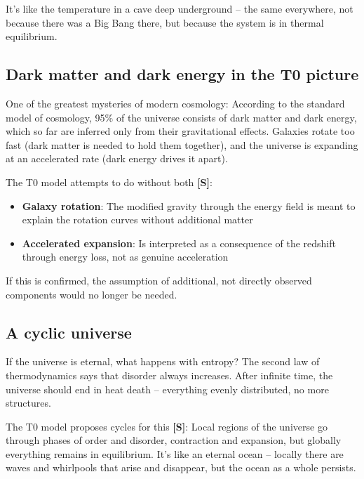 	It's like the temperature in a cave deep underground -- the same everywhere, not because there was a Big Bang there, but because the system is in thermal equilibrium.
	
	\subsection{Dark matter and dark energy in the T0 picture}
	
	One of the greatest mysteries of modern cosmology: According to the standard model of cosmology, 95\% of the universe consists of dark matter and dark energy, which so far are inferred only from their gravitational effects. Galaxies rotate too fast (dark matter is needed to hold them together), and the universe is expanding at an accelerated rate (dark energy drives it apart).
	
	The T0 model attempts to do without both \textbf{[S]}:
	\begin{itemize}
		\item \textbf{Galaxy rotation}: The modified gravity through the energy field is meant to explain the rotation curves without additional matter
		\item \textbf{Accelerated expansion}: Is interpreted as a consequence of the redshift through energy loss, not as genuine acceleration
	\end{itemize}

	If this is confirmed, the assumption of additional, not directly observed components would no longer be needed.
	
	\subsection{A cyclic universe}
	
	If the universe is eternal, what happens with entropy? The second law of thermodynamics says that disorder always increases. After infinite time, the universe should end in heat death -- everything evenly distributed, no more structures.
	
	The T0 model proposes cycles for this \textbf{[S]}: Local regions of the universe go through phases of order and disorder, contraction and expansion, but globally everything remains in equilibrium. It's like an eternal ocean -- locally there are waves and whirlpools that arise and disappear, but the ocean as a whole persists.
	